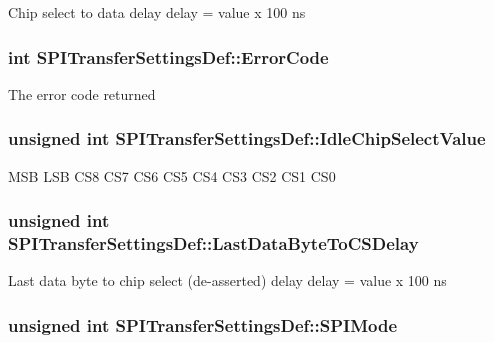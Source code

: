 \-Chip select to data delay delay = value x 100 ns \hypertarget{struct_s_p_i_transfer_settings_def_a06e000b94a109cb22dd362ec768eedc7}{
\subsubsection[{\-Error\-Code}]{\setlength{\rightskip}{0pt plus 5cm}int {\bf \-S\-P\-I\-Transfer\-Settings\-Def\-::\-Error\-Code}}}\label{struct_s_p_i_transfer_settings_def_a06e000b94a109cb22dd362ec768eedc7}
\-The error code returned \hypertarget{struct_s_p_i_transfer_settings_def_a2f469778bc45bfaae06c0779c53457a9}{
\subsubsection[{\-Idle\-Chip\-Select\-Value}]{\setlength{\rightskip}{0pt plus 5cm}unsigned int {\bf \-S\-P\-I\-Transfer\-Settings\-Def\-::\-Idle\-Chip\-Select\-Value}}}\label{struct_s_p_i_transfer_settings_def_a2f469778bc45bfaae06c0779c53457a9}
\-M\-S\-B \-L\-S\-B \-C\-S8 \-C\-S7 \-C\-S6 \-C\-S5 \-C\-S4 \-C\-S3 \-C\-S2 \-C\-S1 \-C\-S0 \hypertarget{struct_s_p_i_transfer_settings_def_a5c05d83e86f6d4cb9437d00a4c7a38a2}{
\subsubsection[{\-Last\-Data\-Byte\-To\-C\-S\-Delay}]{\setlength{\rightskip}{0pt plus 5cm}unsigned int {\bf \-S\-P\-I\-Transfer\-Settings\-Def\-::\-Last\-Data\-Byte\-To\-C\-S\-Delay}}}\label{struct_s_p_i_transfer_settings_def_a5c05d83e86f6d4cb9437d00a4c7a38a2}
\-Last data byte to chip select (de-\/asserted) delay delay = value x 100 ns \hypertarget{struct_s_p_i_transfer_settings_def_a362c078515ae312b89face990d02d6c6}{
\subsubsection[{\-S\-P\-I\-Mode}]{\setlength{\rightskip}{0pt plus 5cm}unsigned int {\bf \-S\-P\-I\-Transfer\-Settings\-Def\-::\-S\-P\-I\-Mode}}}\label{struct_s_p_i_transfer_settings_def_a362c078515ae312b89face990d02d6c6}
